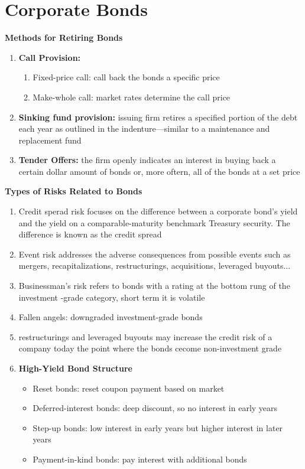 \documentclass[11pt,fleqn]{report} %
\numberwithin{equation}{section} %
\numberwithin{figure}{section} %
\numberwithin{table}{section} %
\begin{document}
\chapter{Corporate Bonds}
\begin{definition}\textbf{Methods for Retiring Bonds}
    \begin{enumerate}
        \item \textbf{Call Provision:}
        \begin{enumerate}
            \item Fixed-price call: call back the bonds a specific price
            \item Make-whole call: market rates determine the call price
        \end{enumerate}
        \item \textbf{Sinking fund provision:} issuing firm retires a specified portion of the debt
        each year as outlined in the indenture---similar to a maintenance and replacement fund
        \item \textbf{Tender Offers:} the firm openly indicates an interest in buying back a certain
        dollar amount of bonds or, more oftern, all of the bonds at a set price
    \end{enumerate}
\end{definition}
\begin{definition}\textbf{Types of Risks Related to Bonds}
    \begin{enumerate}
        \item Credit sperad risk focuses on the difference between a corporate bond's
        yield and the yield on a comparable-maturity benchmark Treasury security.
        The difference is known as the credit spread
        \item Event risk addresses the adverse consequences from possible events such as
        mergers, recapitalizations, restructurings, acquisitions, leveraged buyouts... 
        \item Businessman's risk refers to bonds with a rating at the bottom rung of the investment
        -grade category, short term it is volatile
        \item Fallen angels: downgraded investment-grade bonds
        \item restructurings and leveraged buyouts may increase the credit risk of a company today
        the point where the bonds cecome non-investment grade
        \item \textbf{High-Yield Bond Structure}
        \begin{itemize}
            \item Reset bonds: reset coupon payment based on market
            \item Deferred-interest bonds: deep discount, so no interest in early years
            \item Step-up bonds: low interest in early years but higher interest in later years
            \item Payment-in-kind bonds: pay interest with additional bonds
        \end{itemize}
    \end{enumerate}
\end{definition}
\end{document}

